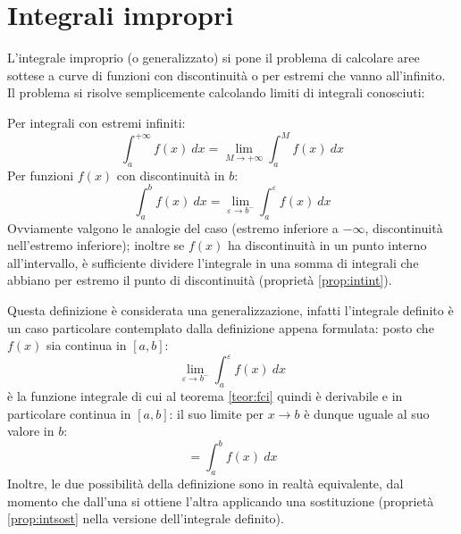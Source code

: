 \section{Integrali impropri}
L'integrale improprio (o generalizzato) si pone il problema di calcolare aree sottese a curve di funzioni con discontinuità o per estremi che vanno all'infinito. Il problema si risolve semplicemente calcolando limiti di integrali conosciuti:
\begin{defin}
	Per integrali con estremi infiniti:
	\begin{equation}
		\int_a^{+\infty}f(x)~dx=\lim_{M\to+\infty}\int_a^M f(x)~dx
	\end{equation}
	Per funzioni $f(x)$ con discontinuità in $b$:
	\begin{equation}
		\int_a^b f(x)~dx=\lim_{\varepsilon\to b^-}\int_a^\varepsilon f(x)~dx
	\end{equation}
	Ovviamente valgono le analogie del caso (estremo inferiore a $-\infty$, discontinuità nell'estremo inferiore); inoltre se $f(x)$ ha discontinuità in un punto interno all'intervallo, è sufficiente dividere l'integrale in una somma di integrali che abbiano per estremo il punto di discontinuità (proprietà \vref{prop:intint}).
\end{defin}
Questa definizione è considerata una generalizzazione, infatti l'integrale definito è un caso particolare contemplato dalla definizione appena formulata: posto che $f(x)$ sia continua in $[a,b]$:
\[
	\lim_{\varepsilon\to b^-} \int_a^\varepsilon f(x)~dx
\]
è la funzione integrale di cui al teorema \ref{teor:fci} quindi è derivabile e in particolare continua in $[a,b]$: il suo limite per $x\to b$ è dunque uguale al suo valore in $b$:
\[
	=\int_a^b f(x)~dx
\]
Inoltre, le due possibilità della definizione sono in realtà equivalente, dal momento che dall'una si ottiene l'altra applicando una sostituzione (proprietà \ref{prop:intsost} nella versione dell'integrale definito).

